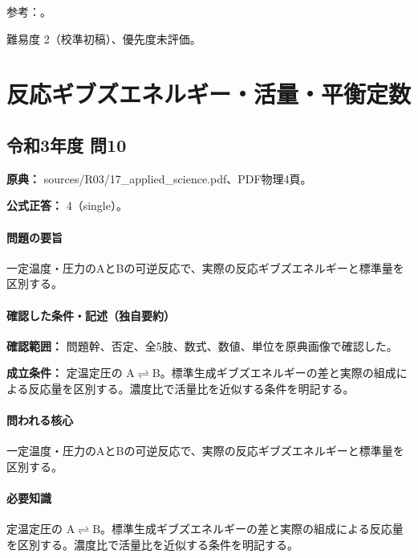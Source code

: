 \par 参考：\cite{iupac_greenbook2012}。

\par 難易度 2（校準初稿）、優先度未評価。

\section{反応ギブズエネルギー・活量・平衡定数}

\subsection{令和3年度 問10}
\label{q:r03-reg-applied-10}

\noindent\textbf{原典：} sources/R03/17\_applied\_science.pdf、PDF物理4頁。

\textbf{公式正答：} 4（single）。

\paragraph{問題の要旨} 一定温度・圧力のAとBの可逆反応で、実際の反応ギブズエネルギーと標準量を区別する。

\paragraph{確認した条件・記述（独自要約）}\mbox{}\par

\noindent\textbf{確認範囲：} 問題幹、否定、全5肢、数式、数値、単位を原典画像で確認した。\par

\noindent\textbf{成立条件：} 定温定圧の \(\mathrm{A\rightleftharpoons B}\)。標準生成ギブズエネルギーの差と実際の組成による反応量を区別する。濃度比で活量比を近似する条件を明記する。\par

\paragraph{問われる核心} 一定温度・圧力のAとBの可逆反応で、実際の反応ギブズエネルギーと標準量を区別する。

\paragraph{必要知識} 定温定圧の \(\mathrm{A\rightleftharpoons B}\)。標準生成ギブズエネルギーの差と実際の組成による反応量を区別する。濃度比で活量比を近似する条件を明記する。

